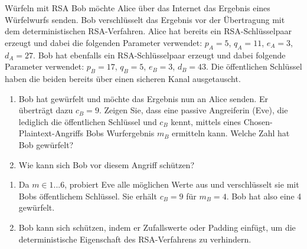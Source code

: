 \documentclass{article}
\begin{document}
\setcounter{subsection}{1609}
\begin{exercise}{Würfeln mit RSA}
  Bob möchte Alice über das Internet das Ergebnis eines Würfelwurfs senden. Bob verschlüsselt das Ergebnis vor der Übertragung mit dem deterministischen RSA-Verfahren. Alice hat bereits ein RSA-Schlüsselpaar erzeugt und dabei die folgenden Parameter verwendet: $p_A = 5$, $q_A = 11$, $e_A = 3$, $d_A = 27$. Bob hat ebenfalls ein RSA-Schlüsselpaar erzeugt und dabei folgende Parameter verwendet: $p_B = 17$, $q_B = 5$, $e_B = 3$, $d_B = 43$. Die öffentlichen Schlüssel haben die beiden bereits über einen sicheren Kanal ausgetauscht.
  \begin{enumerate}
    \item Bob hat gewürfelt und möchte das Ergebnis nun an Alice senden. Er überträgt dazu $c_B = 9$. Zeigen Sie, dass eine passive Angreiferin (Eve), die lediglich die öffentlichen Schlüssel und $c_B$ kennt, mittels eines Chosen-Plaintext-Angriffs Bobs Wurfergebnis $m_B$ ermitteln kann. Welche Zahl hat Bob gewürfelt?
    \item Wie kann sich Bob vor diesem Angriff schützen?
  \end{enumerate}

  \begin{solution}
    \begin{enumerate}
        \item Da $m\in{1...6}$, probiert Eve alle möglichen Werte aus und verschlüsselt sie mit Bobs öffentlichem Schlüssel. Sie erhält $c_B = 9$ für $m_B = 4$. Bob hat also eine 4 gewürfelt.
        \item Bob kann sich schützen, indem er Zufallswerte oder Padding einfügt, um die deterministische Eigenschaft des RSA-Verfahrens zu verhindern.
    \end{enumerate}
  \end{solution}
\end{exercise}
\end{document}
